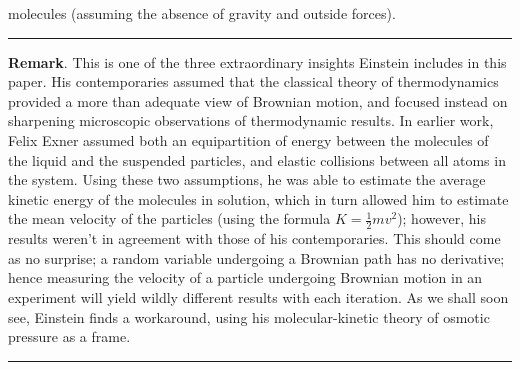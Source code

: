 \documentclass[12pt,reqno]{amsart}
\theoremstyle{plain}  %
\theoremstyle{definition}
\begin{document}
molecules (assuming the absence of gravity and outside forces).
\\
\hrule
{\bf Remark}. This is one of the three extraordinary insights Einstein includes in
this paper. His contemporaries assumed that the classical theory of thermodynamics
provided a more than adequate view of Brownian motion, and focused instead on
sharpening microscopic observations of thermodynamic results. In earlier work, Felix
Exner assumed both an equipartition of energy between the molecules of the liquid
and the suspended particles, and elastic collisions
between all atoms in the system. Using these two
assumptions, he was able to estimate the average kinetic energy of the molecules in
solution, which in turn allowed him to estimate the mean velocity
of the particles (using the formula $K = \frac{1}{2}mv^2$); however, his results
weren't in agreement with those of his contemporaries. This
should come as no surprise; a random variable undergoing a Brownian path has no
derivative; hence measuring the velocity of a particle undergoing Brownian motion in an
experiment will yield wildly different results with each iteration. As we shall soon
see, Einstein finds a workaround, using his molecular-kinetic theory of osmotic
pressure as a frame.
\\
\hrule
\end{document}

